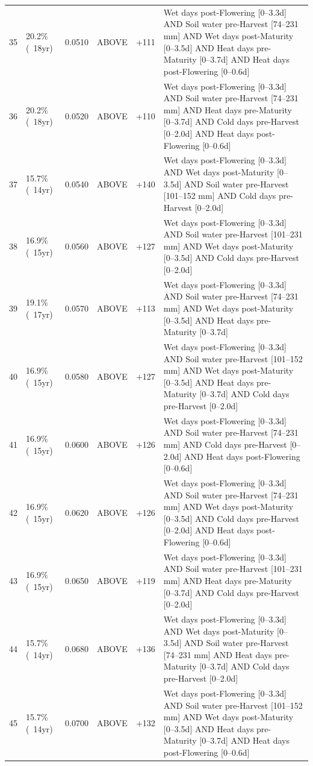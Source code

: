 {\begin{longtable}{p{0.4cm}|p{1.5cm}|p{1.2cm}|p{1.3cm}|p{1.5cm}|p{8.2cm}}
  35 & 20.2\% (~18yr) & 0.0510 & ABOVE & +111 & Wet days post-Flowering [0--3.3d] AND Soil water pre-Harvest [74--231 mm] AND Wet days post-Maturity [0--3.5d] AND Heat days pre-Maturity [0--3.7d] AND Heat days post-Flowering [0--0.6d] \\
  36 & 20.2\% (~18yr) & 0.0520 & ABOVE & +110 & Wet days post-Flowering [0--3.3d] AND Soil water pre-Harvest [74--231 mm] AND Heat days pre-Maturity [0--3.7d] AND Cold days pre-Harvest [0--2.0d] AND Heat days post-Flowering [0--0.6d] \\
  37 & 15.7\% (~14yr) & 0.0540 & ABOVE & +140 & Wet days post-Flowering [0--3.3d] AND Wet days post-Maturity [0--3.5d] AND Soil water pre-Harvest [101--152 mm] AND Cold days pre-Harvest [0--2.0d] \\
  38 & 16.9\% (~15yr) & 0.0560 & ABOVE & +127 & Wet days post-Flowering [0--3.3d] AND Soil water pre-Harvest [101--231 mm] AND Wet days post-Maturity [0--3.5d] AND Cold days pre-Harvest [0--2.0d] \\
  39 & 19.1\% (~17yr) & 0.0570 & ABOVE & +113 & Wet days post-Flowering [0--3.3d] AND Soil water pre-Harvest [74--231 mm] AND Wet days post-Maturity [0--3.5d] AND Heat days pre-Maturity [0--3.7d] \\
  40 & 16.9\% (~15yr) & 0.0580 & ABOVE & +127 & Wet days post-Flowering [0--3.3d] AND Soil water pre-Harvest [101--152 mm] AND Wet days post-Maturity [0--3.5d] AND Heat days pre-Maturity [0--3.7d] AND Cold days pre-Harvest [0--2.0d] \\
  41 & 16.9\% (~15yr) & 0.0600 & ABOVE & +126 & Wet days post-Flowering [0--3.3d] AND Soil water pre-Harvest [74--231 mm] AND Cold days pre-Harvest [0--2.0d] AND Heat days post-Flowering [0--0.6d] \\
  42 & 16.9\% (~15yr) & 0.0620 & ABOVE & +126 & Wet days post-Flowering [0--3.3d] AND Soil water pre-Harvest [74--231 mm] AND Wet days post-Maturity [0--3.5d] AND Cold days pre-Harvest [0--2.0d] AND Heat days post-Flowering [0--0.6d] \\
  43 & 16.9\% (~15yr) & 0.0650 & ABOVE & +119 & Wet days post-Flowering [0--3.3d] AND Soil water pre-Harvest [101--231 mm] AND Heat days pre-Maturity [0--3.7d] AND Cold days pre-Harvest [0--2.0d] \\
  44 & 15.7\% (~14yr) & 0.0680 & ABOVE & +136 & Wet days post-Flowering [0--3.3d] AND Wet days post-Maturity [0--3.5d] AND Soil water pre-Harvest [74--231 mm] AND Heat days pre-Maturity [0--3.7d] AND Cold days pre-Harvest [0--2.0d] \\
  45 & 15.7\% (~14yr) & 0.0700 & ABOVE & +132 & Wet days post-Flowering [0--3.3d] AND Soil water pre-Harvest [101--152 mm] AND Wet days post-Maturity [0--3.5d] AND Heat days pre-Maturity [0--3.7d] AND Heat days post-Flowering [0--0.6d] \\

\end{longtable}}
